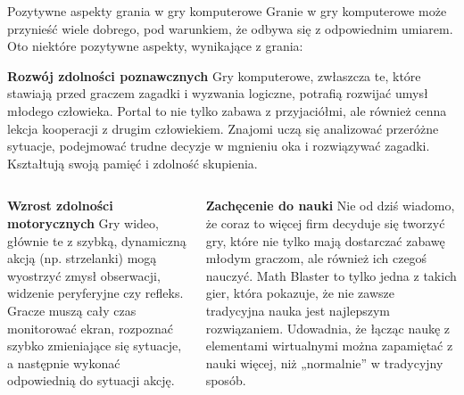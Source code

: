 \documentclass{beamer}
\begin{document}
\begin{frame}{Pozytywne aspekty grania w gry komputerowe} %
Granie w gry komputerowe może przynieść wiele dobrego, pod warunkiem, że odbywa się z odpowiednim umiarem. Oto niektóre pozytywne aspekty, wynikające z grania: 
\newline

        \normalsize \textbf {Rozwój zdolności poznawcznych}
\newline
Gry komputerowe, zwłaszcza te, które stawiają przed graczem zagadki i wyzwania logiczne, potrafią rozwijać umysł młodego człowieka. Portal to nie tylko zabawa z przyjaciółmi, ale również cenna lekcja kooperacji z drugim człowiekiem. Znajomi uczą się analizować przeróżne sytuacje, podejmować trudne decyzje w mgnieniu oka i rozwiązywać zagadki. Kształtują swoją pamięć i zdolność skupienia. 

\end{frame}

\begin{frame} %
\begin{columns}
\begin{column}{0.5\textwidth}
	   \normalsize \textbf {Wzrost zdolności motorycznych}
\newline
 Gry wideo, głównie te z szybką, dynamiczną akcją (np. strzelanki) mogą wyostrzyć zmysł obserwacji, widzenie peryferyjne czy refleks. Gracze muszą cały czas monitorować ekran, rozpoznać szybko zmieniające się sytuacje, a następnie wykonać odpowiednią do sytuacji akcję.
\end{column}

\begin{column}{0.5\textwidth}
	   \normalsize \textbf {Zachęcenie do nauki}
\newline
 \small Nie od dziś wiadomo, że coraz to więcej firm decyduje się tworzyć gry, które nie tylko mają dostarczać zabawę młodym graczom, ale również ich czegoś nauczyć. Math Blaster to tylko jedna z takich gier, która pokazuje, że nie zawsze tradycyjna nauka jest najlepszym rozwiązaniem. Udowadnia, że łącząc naukę z elementami wirtualnymi można zapamiętać z nauki więcej, niż „normalnie” w tradycyjny sposób.

\end{column}
\end{columns}
\end{frame}
\end{document}
